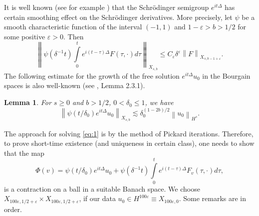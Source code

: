 \documentclass[draft,11pt,leqno]{amsart}
\newtheorem{lemma}{Lemma}
\newcommand{\norm}[2]{{\left\| #1 \right\|}_{#2}}
\newcommand{\de}{\delta}
\newcommand{\De}{\Delta}
\newcommand{\ve}{\varepsilon}
\newcommand{\intl}{\int\limits}
\begin{document}
It is well known (see for example \cite{Staffilani}) that the Schr\"odinger
semigroup $e^{i t \De}$ has certain smoothing effect on the Schr\"odinger derivatives. More precisely, let $\psi$ be a smooth characteristic function
of the interval $(-1,1)$ and  $1-\ve>b>1/2$ for some positive $\ve>0$. Then
\begin{equation}
\label{eq:2}
\norm{\psi(\de^{-1}t) \intl_0^t 
e^{i (t-\tau)\De} F(\tau,\cdot)d\tau}{X_{s,b}}\leq C_\ve\de^\ve 
\norm{F}{X_{s,b-1+\ve}}.
\end{equation}
The following estimate for the growth of the free solution $e^{i t \De}u_0$ 
in the Bourgain spaces is also well-known (see \cite{Staffilani}, 
Lemma 2.3.1).
\begin{lemma}
\label{le:132}
For
$s\geq 0$ and $b>1/2$, $0<\de_0\leq 1$, we have
$$
\norm{\psi(t/\de_0)e^{i t \De}u_0}{X_{s,b}}\lesssim \de_0^{(1-2b)/2}
\norm{u_0}{H^s}.
$$
\end{lemma}
The approach for solving \eqref{eq:1} is by the
method of Pickard iterations. Therefore, to prove short-time existence
(and uniqueness in certain class), one needs to show that the map
$$
\Phi(v)=\psi(t/\de_0)e^{i t \De}u_0+\psi(\de^{-1}t)\intl_0^t e^{i (t-\tau)\De}F_v(\tau, \cdot)d\tau,
$$
is a contraction on a ball in a suitable Banach space. We choose
$X_{100\ve,1/2+\ve}\times X_{100\ve,1/2+\ve} $, if our data 
$u_0\in H^{100\ve}\equiv X_{100\ve,0}$.
\vspace{.3cm}
Some remarks are in order. 
\vspace{.3cm}
\end{document}
